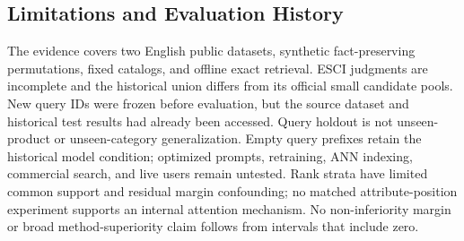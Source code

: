 \subsection{Limitations and Evaluation History}
The evidence covers two English public datasets, synthetic fact-preserving permutations, fixed catalogs, and offline exact retrieval. ESCI judgments are incomplete and the historical union differs from its official small candidate pools. New query IDs were frozen before evaluation, but the source dataset and historical test results had already been accessed. Query holdout is not unseen-product or unseen-category generalization. Empty query prefixes retain the historical model condition; optimized prompts, retraining, ANN indexing, commercial search, and live users remain untested. Rank strata have limited common support and residual margin confounding; no matched attribute-position experiment supports an internal attention mechanism. No non-inferiority margin or broad method-superiority claim follows from intervals that include zero.
